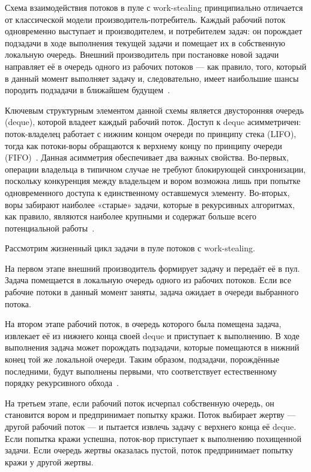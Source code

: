 Схема взаимодействия потоков в пуле с work-stealing принципиально
отличается от классической модели производитель-потребитель.
Каждый рабочий поток одновременно выступает и производителем,
и потребителем задач: он порождает подзадачи в ходе выполнения
текущей задачи и помещает их в собственную локальную очередь.
Внешний производитель при постановке новой задачи направляет её
в очередь одного из рабочих потоков --- как правило, того, который
в данный момент выполняет задачу и, следовательно, имеет наибольшие
шансы породить подзадачи в ближайшем будущем~\cite{Chase2005}.

Ключевым структурным элементом данной схемы является двусторонняя
очередь (deque), которой владеет каждый рабочий поток. Доступ
к deque асимметричен: поток-владелец работает с нижним концом
очереди по принципу стека (LIFO), тогда как потоки-воры
обращаются к верхнему концу по принципу очереди
(FIFO)~\cite{Blumofe1999}. Данная асимметрия обеспечивает два
важных свойства. Во-первых, операции владельца в типичном случае
не требуют блокирующей синхронизации, поскольку конкуренция
между владельцем и вором возможна лишь при попытке одновременного
доступа к единственному оставшемуся элементу. Во-вторых, воры
забирают наиболее «старые» задачи, которые в рекурсивных
алгоритмах, как правило, являются наиболее крупными и содержат
больше всего потенциальной работы~\cite{Acar2000}.

Рассмотрим жизненный цикл задачи в пуле потоков с work-stealing.

На первом этапе внешний производитель формирует задачу и
передаёт её в пул. Задача помещается в локальную очередь одного
из рабочих потоков. Если все рабочие потоки в данный момент
заняты, задача ожидает в очереди выбранного потока.

На втором этапе рабочий поток, в очередь которого была помещена
задача, извлекает её из нижнего конца своей deque и приступает
к выполнению. В ходе выполнения задача может порождать подзадачи,
которые помещаются в нижний конец той же локальной очереди. Таким
образом, подзадачи, порождённые последними, будут выполнены первыми,
что соответствует естественному порядку рекурсивного
обхода~\cite{Williams2019}.

На третьем этапе, если рабочий поток исчерпал собственную
очередь, он становится вором и предпринимает попытку кражи.
Поток выбирает жертву --- другой рабочий поток --- и пытается
извлечь задачу с верхнего конца её deque. Если попытка кражи
успешна, поток-вор приступает к выполнению похищенной задачи.
Если очередь жертвы оказалась пустой, поток предпринимает
попытку кражи у другой жертвы.

